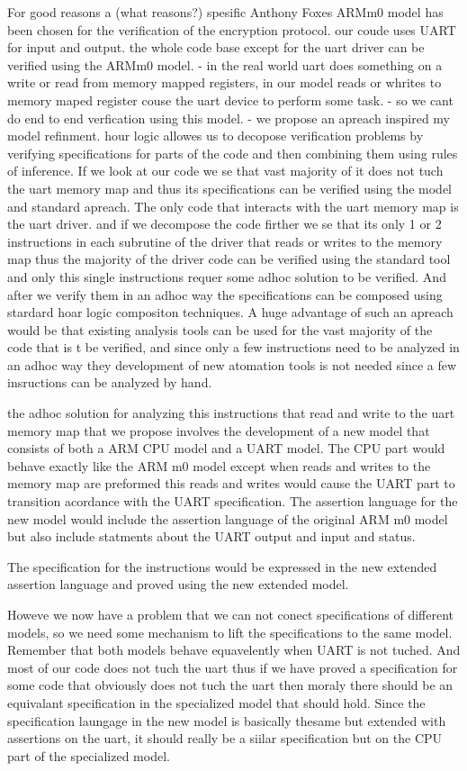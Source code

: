 For good reasons a (what reasons?) spesific Anthony Foxes ARMm0 model has been chosen for the verification of the encryption protocol. our coude uses UART for input and output. the whole code base except for the uart driver can be verified using the ARMm0 model.
- in the real world uart does something on a write or read from memory mapped registers, in our model reads or whrites to memory maped register couse the uart device to perform some task.
- so we cant do end to end verfication using this model.
- we propose an apreach inspired my model refinment. hour logic allowes us to decopose verification problems by verifying specifications for parts of the code and then combining them using rules of inference.
If we look at our code we se that vast majority of it does not tuch the uart memory map and thus its specifications can be verified using the model and standard apreach. The only code that interacts with the uart memory map is the uart driver. and if we decompose the code firther we se that its only 1 or 2 instructions in each subrutine of the driver that reads or writes to the memory map thus the majority of the driver code can be verified using the standard tool and only this single instructions requer some adhoc solution to be verified. And after we verify them in an adhoc way the specifications can be composed using stardard hoar logic compositon techniques. A huge advantage of such an apreach would be that existing analysis tools can be used for the vast majority of the code that is t be verified, and since only a few instructions need to be analyzed in an adhoc way they development of new atomation tools is not needed since a few insructions can be analyzed by hand.

the adhoc solution for analyzing this instructions that read and write to the uart memory map that we propose involves the development of a new model that consists of both a ARM CPU model and a UART model. The CPU part would behave exactly like the ARM m0 model except when reads and writes to the memory map are preformed this reads and writes would cause the UART part to transition acordance with the UART specification.
The assertion language for the new model would include the assertion language of the original ARM m0 model but also include statments about the UART output and input and status.

The specification for the instructions would be expressed in the new extended assertion language and proved using the new extended model.

Howeve we now have a problem that we can not conect specifications of different models, so we need some mechanism to lift the specifications to the same model. Remember that both models behave equavelently when UART is not tuched. And most of our code does not tuch the uart thus if we have proved a specification for some code that obviously does not tuch the uart then moraly there should be an equivalant specification in the specialized model that should hold. Since the specification laungage in the new model is basically thesame but extended with assertions on the uart, it should really be a siilar specification but on the CPU part of the specialized model.

